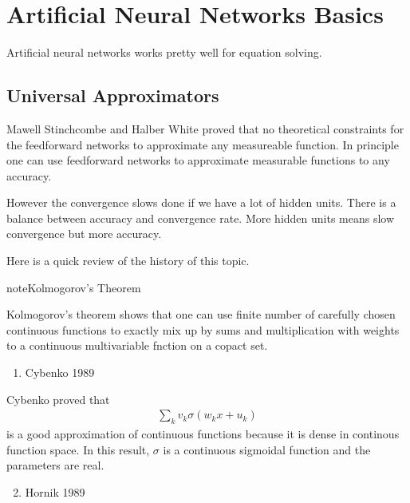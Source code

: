 \documentclass[letterpaper,12pt,english]{sphinxmanual}
\begin{document}
\section{Artificial Neural Networks Basics}
\label{\detokenize{artificial-neural-network/ann::doc}}\label{\detokenize{artificial-neural-network/ann:artificial-neural-networks-basics}}
Artificial neural networks works pretty well for equation solving.


\subsection{Universal Approximators}
\label{\detokenize{artificial-neural-network/ann:universal-approximators}}
Mawell Stinchcombe and Halber White proved that no theoretical constraints for the feedforward networks to approximate any measureable function. In principle one can use feedforward networks to approximate measurable functions to any accuracy.

However the convergence slows done if we have a lot of hidden units. There is a balance between accuracy and convergence rate. More hidden units means slow convergence but more accuracy.

Here is a quick review of the history of this topic.

\begin{sphinxadmonition}{note}{Kolmogorov's Theorem}

Kolmogorov's theorem shows that one can use finite number of carefully chosen continuous functions to exactly mix up by sums and multiplication with weights to a continuous multivariable fnction on a copact set.

\end{sphinxadmonition}
\begin{enumerate}
\item {} 
Cybenko 1989

\end{enumerate}

Cybenko proved that
\begin{equation*}
\begin{split}\sum_k v_k \sigma(w_k x + u_k)\end{split}
\end{equation*}
is a good approximation of continuous functions because it is dense in continous function space. In this result, \(\sigma\) is a continuous sigmoidal function and the parameters are real.
\begin{enumerate}
\setcounter{enumi}{1}
\item {} 
Hornik 1989

\end{enumerate}
\end{document}
